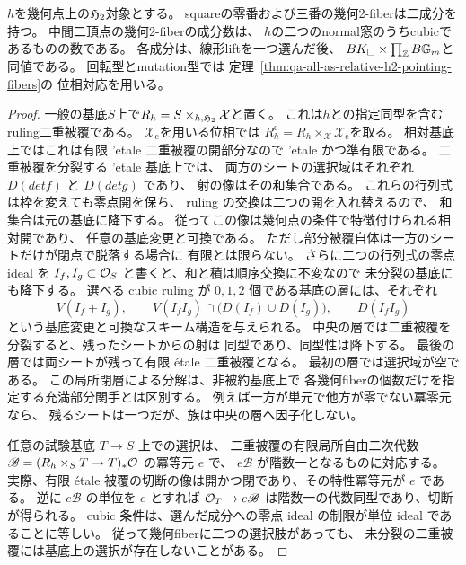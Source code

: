 \begin{corollary}
\label{cor:qa-standard-pointing-geometric-fibers}
$h$を幾何点上の$\mathfrak H_2$対象とする。
squareの零番および三番の幾何2-fiberは二成分を持つ。
中間二頂点の幾何2-fiberの成分数は、
$h$の二つのnormal窓のうちcubicであるものの数である。
各成分は、線形liftを一つ選んだ後、
$BK_\square\times\prod_{\mathbb Z}B\mathbb G_m$と同値である。
回転型とmutation型では
定理~\ref{thm:qa-all-as-relative-h2-pointing-fibers}の
位相対応を用いる。
\end{corollary}
\begin{proof}
一般の基底$S$上で$R_h=S\times_{h,\mathfrak H_2}\mathcal X$と置く。
これは$h$との指定同型を含むruling二重被覆である。
$\mathcal X_{\mathrm c}$を用いる位相では
$R_h^{\mathrm c}=R_h\times_{\mathcal X}\mathcal X_{\mathrm c}$を取る。
相対基底上ではこれは有限 'etale 二重被覆の開部分なので
'etale かつ準有限である。
二重被覆を分裂する 'etale 基底上では、
両方のシートの選択域はそれぞれ $D(det f)$ と $D(det g)$ であり、
射の像はその和集合である。
これらの行列式は枠を変えても零点開を保ち、
ruling の交換は二つの開を入れ替えるので、
和集合は元の基底に降下する。
従ってこの像は幾何点の条件で特徴付けられる相対開であり、
任意の基底変更と可換である。
ただし部分被覆自体は一方のシートだけが閉点で脱落する場合に
有限とは限らない。
さらに二つの行列式の零点 ideal を
$I_f,I_g\subset\mathcal O_S$ と書くと、和と積は順序交換に不変なので
未分裂の基底にも降下する。
選べる cubic ruling が $0,1,2$ 個である基底の層には、それぞれ
\[
 V(I_f+I_g),\qquad
 V(I_f I_g)\cap\bigl(D(I_f)\cup D(I_g)\bigr),\qquad
 D(I_f I_g)
\]
という基底変更と可換なスキーム構造を与えられる。
中央の層では二重被覆を分裂すると、残ったシートからの射は
同型であり、同型性は降下する。
最後の層では両シートが残って有限 \'etale 二重被覆となる。
最初の層では選択域が空である。
この局所閉層による分解は、非被約基底上で
各幾何fiberの個数だけを指定する充満部分関手とは区別する。
例えば一方が単元で他方が零でない冪零元なら、
残るシートは一つだが、族は中央の層へ因子化しない。

任意の試験基底 $T\to S$ 上での選択は、
二重被覆の有限局所自由二次代数
$\mathscr B=(R_h\times_S T\to T)_*\mathcal O$ の冪等元 $e$ で、
$e\mathscr B$ が階数一となるものに対応する。
実際、有限 \'etale 被覆の切断の像は開かつ閉であり、その特性冪等元が $e$ である。
逆に $e\mathscr B$ の単位を $e$ とすれば
$\mathcal O_T\to e\mathscr B$ は階数一の代数同型であり、切断が得られる。
cubic 条件は、選んだ成分への零点 ideal の制限が単位 ideal であることに等しい。
従って幾何fiberに二つの選択肢があっても、
未分裂の二重被覆には基底上の選択が存在しないことがある。


\end{proof}

